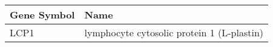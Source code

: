 \begin{tabular}{ll}
\toprule
Gene Symbol &                                       Name \\
\midrule
       LCP1 & lymphocyte cytosolic protein 1 (L-plastin) \\
\bottomrule
\end{tabular}
